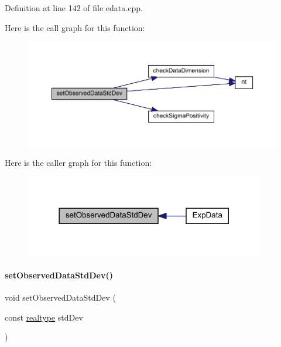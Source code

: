 Definition at line 142 of file edata.\+cpp.

Here is the call graph for this function\+:
\nopagebreak
\begin{figure}[H]
\begin{center}
\leavevmode
\includegraphics[width=350pt]{classamici_1_1_exp_data_a5d84a162eb705e032820acd004603f29_cgraph}
\end{center}
\end{figure}
Here is the caller graph for this function\+:
\nopagebreak
\begin{figure}[H]
\begin{center}
\leavevmode
\includegraphics[width=297pt]{classamici_1_1_exp_data_a5d84a162eb705e032820acd004603f29_icgraph}
\end{center}
\end{figure}
\mbox{\label{classamici_1_1_exp_data_ae6ed832b9bee1861d233c90d5a37c677}} 
\paragraph{\texorpdfstring{set\+Observed\+Data\+Std\+Dev()}{setObservedDataStdDev()}\hspace{0.1cm}{\footnotesize\ttfamily [2/4]}}
{\footnotesize\ttfamily void set\+Observed\+Data\+Std\+Dev (\begin{DoxyParamCaption}\item[{const \mbox{\hyperlink{namespaceamici_a1bdce28051d6a53868f7ccbf5f2c14a3}{realtype}}}]{std\+Dev }\end{DoxyParamCaption})}

